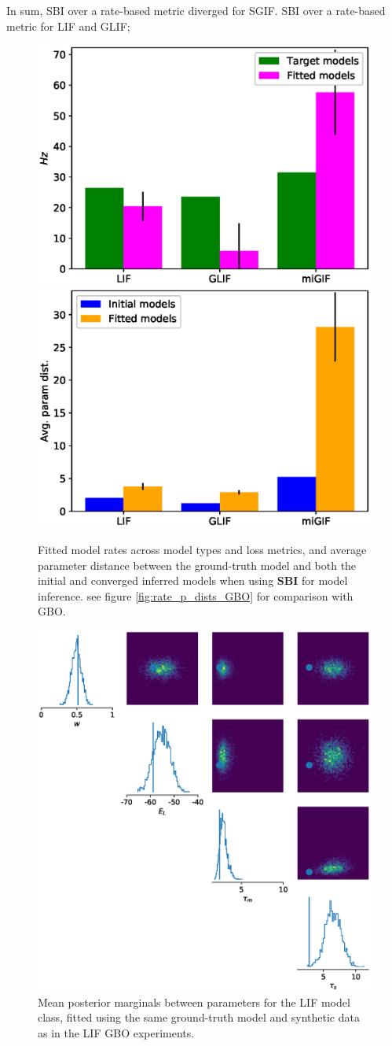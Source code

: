 \documentclass[mphil,deptreport,ianc]{infthesis} %
\begin{document}
In sum, SBI over a rate-based metric diverged for SGIF.
SBI over a rate-based metric for LIF and GLIF; 

\begin{figure}
    \centering
	\includegraphics[width=0.49\columnwidth]{figures/sbi_plot_rates_all.eps}
	\includegraphics[width=0.49\columnwidth]{figures/sbi_mean_p_dist_all.eps}
	\caption{Fitted model rates across model types and loss metrics, and average parameter distance between the ground-truth model and both the initial and converged inferred models when using \textbf{SBI} for model inference. see figure \ref{fig:rate_p_dists_GBO} for comparison with GBO.}
	\label{fig:rate_p_dists_SBI}
\end{figure}


\begin{figure}
    \centering
	\includegraphics[width=0.5\columnwidth]{figures/sbi_p_avgs_pairplot_SNPE_LIF_12-15_04-56-19-338.eps}
	\caption{Mean posterior marginals between parameters for the LIF model class, fitted using the same ground-truth model and synthetic data as in the LIF GBO experiments.}
\end{figure}
\end{document}
